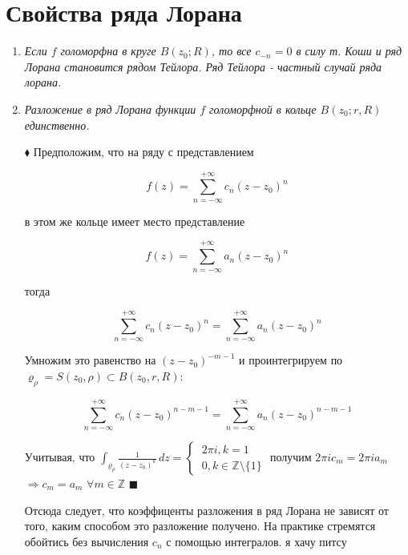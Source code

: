 \documentclass[a4paper, 12pt]{report}
\begin{document}
\section{Свойства ряда Лорана}
\begin{enumerate}
    \item \textsl{Если $f$ голоморфна в круге $B(z_0; R)$, то все $c_{-n} = 0$ в силу т. Коши и ряд Лорана становится рядом Тейлора. Ряд Тейлора - частный случай ряда лорана.}
    \item \textsl{Разложение в ряд Лорана функции $f$ голоморфной в кольце $B(z_0; r, R)$ единственно.}

$\blacklozenge$\hspace{1 mm} Предположим, что на ряду с представлением 
\begin{center}
$$ f(z) = \sum_{n = -\infty}^{+\infty} c_n (z - z_0)^n $$
\end{center}
\par\bigskip
в этом же кольце имеет место представление
\begin{center}
$$ f(z) = \sum_{n = -\infty}^{+\infty} a_n (z - z_0)^n $$
\end{center}
\par тогда
\begin{center}
$$ \sum_{n = -\infty}^{+\infty} c_n (z - z_0)^n = \sum_{n = -\infty}^{+\infty} a_n (z - z_0)^n $$
\end{center}
\par\bigskip
Умножим это равенство на $(z - z_0)^{- m - 1}$ и проинтегрируем по $\varrho_\rho = S(z_0, \rho) \subset B(z_0, r, R)$:
\begin{center}
$$ \sum_{n = -\infty}^{+\infty} c_n (z - z_0)^{n - m - 1} = \sum_{n = -\infty}^{+\infty} a_n (z - z_0)^{n - m - 1} $$
\end{center}
\par\bigskip
Учитывая, что $\int_{\varrho_\rho} \frac{1}{(z-z_0)^k}\, dz = \begin{cases}
    \ 2\pi i, k = 1 \\
    \ 0, k \in \mathbb{Z} \setminus \{1\}
    \end{cases}$
получим $2\pi i c_m = 2\pi i a_m$ $\Rightarrow c_m = a_m$ $\forall m \in \mathbb{Z}$ $\blacksquare$
\par\bigskip
Отсюда следует, что коэффиценты разложения в ряд Лорана не зависят от того, каким способом это разложение получено. На практике стремятся обойтись без вычисления $c_n$ с помощью интегралов. {\tiny{я хачу питсу}}
\par\bigskip


\end{enumerate}
\end{document}
